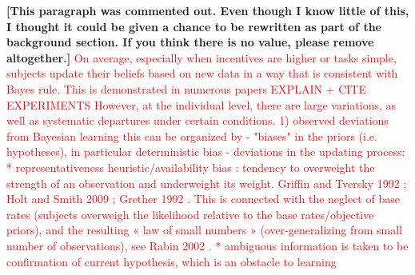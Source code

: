 {\bf [This paragraph was commented out. Even though I know little of this, I thought it could be given a chance to be rewritten as part of the background section. If you think there is no value, please remove altogether.]} \textcolor{red}{
On average, especially when incentives are higher or tasks simple, subjects update their beliefs based on new data in a way that is consistent with Bayes rule.  This is demonstrated in numerous papers \cite{Griffiths2008}EXPLAIN + CITE EXPERIMENTS
However, at the individual level, there are large variations, as well as systematic departures under certain conditions. 
1) observed deviations from Bayesian learning
this can be organized by 
- "biases" in the priors (i.e. hypotheses), in particular deterministic bias
- deviations in the updating process: 
* representativeness heuristic/availability bias : tendency to overweight the strength of an observation and underweight its weight. Griffin and Tversky 1992 \cite{griffin1992weighing}; Holt and Smith 2009 \cite{holt2009update} ; Grether 1992 \cite{grether1992testing}. This is connected with the neglect of base rates (subjects overweigh the likelihood relative to the base rates/objective priors), and the resulting « law of small numbers » (over-generalizing from small number of observations), see Rabin 2002 \cite{rabin2002perspective}.
* ambiguous information is taken to be confirmation of current hypothesis, which is an obstacle to learning
}

